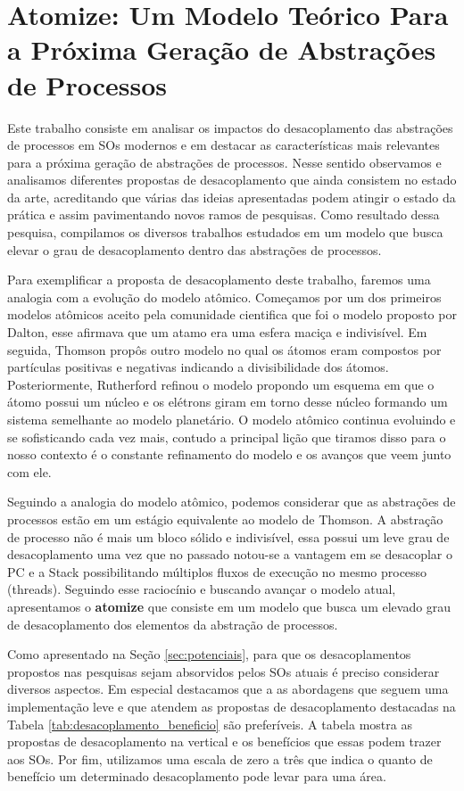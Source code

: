 \section{Atomize: Um Modelo Teórico Para a Próxima Geração de Abstrações de Processos}

Este trabalho consiste em analisar os impactos do desacoplamento das abstrações
de processos em SOs modernos e em destacar as características mais relevantes
para a próxima geração de abstrações de processos. Nesse sentido observamos e
analisamos diferentes propostas de desacoplamento que ainda consistem no estado
da arte, acreditando que várias das ideias apresentadas podem atingir o estado
da prática e assim pavimentando novos ramos de pesquisas. Como resultado dessa
pesquisa, compilamos os diversos trabalhos estudados em um modelo que busca
elevar o grau de desacoplamento dentro das abstrações de processos.

Para exemplificar a proposta de desacoplamento deste trabalho, faremos uma
analogia com a evolução do modelo atômico. Começamos por um dos primeiros
modelos atômicos aceito pela comunidade cientifica que foi o modelo proposto
por Dalton, esse afirmava que um atamo era uma esfera maciça e indivisível. Em
seguida, Thomson propôs outro modelo no qual os átomos eram compostos por
partículas positivas e negativas indicando a divisibilidade dos átomos.
Posteriormente, Rutherford refinou o modelo propondo um esquema em que o átomo
possui um núcleo e os elétrons giram em torno desse núcleo formando um sistema
semelhante ao modelo planetário. O modelo atômico continua evoluindo e se
sofisticando cada vez mais, contudo a principal lição que tiramos disso para o
nosso contexto é o constante refinamento do modelo e os avanços que veem junto
com ele.

Seguindo a analogia do modelo atômico, podemos considerar que as abstrações de
processos estão em um estágio equivalente ao modelo de Thomson. A abstração de
processo não é mais um bloco sólido e indivisível, essa possui um leve grau de
desacoplamento uma vez que no passado notou-se a vantagem em se desacoplar o PC
e a Stack possibilitando múltiplos fluxos de execução no mesmo processo
(threads). Seguindo esse raciocínio e buscando avançar o modelo atual,
apresentamos o \textbf{atomize} que consiste em um modelo que busca um elevado
grau de desacoplamento dos elementos da abstração de processos.

Como apresentado na Seção \ref{sec:potenciais}, para que os desacoplamentos
propostos nas pesquisas sejam absorvidos pelos SOs atuais é preciso considerar
diversos aspectos. Em especial destacamos que a as abordagens que seguem uma
implementação leve e que atendem as propostas de desacoplamento destacadas na
Tabela \ref{tab:desacoplamento_beneficio} são preferíveis. A tabela mostra as
propostas de desacoplamento na vertical e os benefícios que essas podem trazer
aos SOs. Por fim, utilizamos uma escala de zero a três  que indica o
quanto de benefício um determinado desacoplamento pode levar para uma área.

